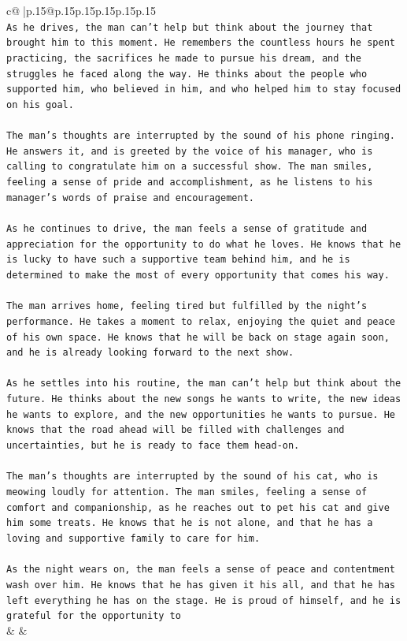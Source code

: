 \documentclass{article}
\begin{document}
{\begin{supertabular}{c@{$\;$}|p{.15\linewidth}@{}p{.15\linewidth}p{.15\linewidth}p{.15\linewidth}p{.15\linewidth}p{.15\linewidth}}
{{{\\ 
\texttt{As he drives, the man can't help but think about the journey that brought him to this moment. He remembers the countless hours he spent practicing, the sacrifices he made to pursue his dream, and the struggles he faced along the way. He thinks about the people who supported him, who believed in him, and who helped him to stay focused on his goal.} \\
\\ 
\texttt{The man's thoughts are interrupted by the sound of his phone ringing. He answers it, and is greeted by the voice of his manager, who is calling to congratulate him on a successful show. The man smiles, feeling a sense of pride and accomplishment, as he listens to his manager's words of praise and encouragement.} \\
\\ 
\texttt{As he continues to drive, the man feels a sense of gratitude and appreciation for the opportunity to do what he loves. He knows that he is lucky to have such a supportive team behind him, and he is determined to make the most of every opportunity that comes his way.} \\
\\ 
\texttt{The man arrives home, feeling tired but fulfilled by the night's performance. He takes a moment to relax, enjoying the quiet and peace of his own space. He knows that he will be back on stage again soon, and he is already looking forward to the next show.} \\
\\ 
\texttt{As he settles into his routine, the man can't help but think about the future. He thinks about the new songs he wants to write, the new ideas he wants to explore, and the new opportunities he wants to pursue. He knows that the road ahead will be filled with challenges and uncertainties, but he is ready to face them head{-}on.} \\
\\ 
\texttt{The man's thoughts are interrupted by the sound of his cat, who is meowing loudly for attention. The man smiles, feeling a sense of comfort and companionship, as he reaches out to pet his cat and give him some treats. He knows that he is not alone, and that he has a loving and supportive family to care for him.} \\
\\ 
\texttt{As the night wears on, the man feels a sense of peace and contentment wash over him. He knows that he has given it his all, and that he has left everything he has on the stage. He is proud of himself, and he is grateful for the opportunity to} \\
            }
        }
    }
    & & \\ \\


\end{supertabular}}
\end{document}
